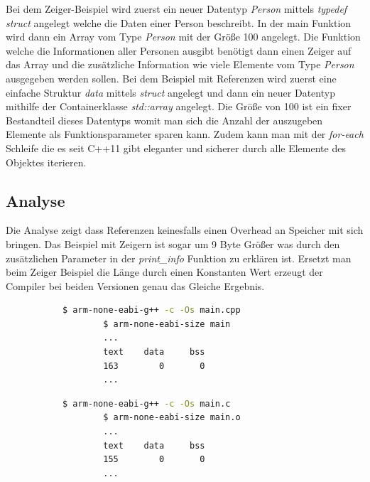 \documentclass[MES,Master,ngerman]{twbook}%
\begin{document}
Bei dem Zeiger-Beispiel wird zuerst ein neuer Datentyp \textit{Person} mittels \textit{typedef struct} angelegt welche die Daten einer Person beschreibt. In der main Funktion wird dann ein Array vom Type \textit{Person} mit der Größe 100 angelegt. Die Funktion welche die Informationen aller Personen ausgibt benötigt dann einen Zeiger auf das Array und die zusätzliche Information wie viele Elemente vom Type \textit{Person} ausgegeben werden sollen.\newline \newline
Bei dem Beispiel mit Referenzen wird zuerst eine einfache Struktur \textit{data} mittels \textit{struct} angelegt und dann ein neuer Datentyp mithilfe der Containerklasse \textit{std::array} angelegt. Die Größe von 100 ist ein fixer Bestandteil dieses Datentyps womit man sich die Anzahl der auszugeben Elemente als Funktionsparameter sparen kann. Zudem kann man mit der \textit{for-each} Schleife die es seit C++11 gibt eleganter und sicherer durch alle Elemente des Objektes iterieren. 

\subsection{Analyse}
Die Analyse zeigt dass Referenzen keinesfalls einen Overhead an Speicher mit sich bringen. Das Beispiel mit Zeigern ist sogar um 9 Byte Größer was durch den zusätzlichen Parameter in der \textit{print\_info} Funktion zu erklären ist. Ersetzt man beim Zeiger Beispiel die Länge durch einen Konstanten Wert erzeugt der Compiler bei beiden Versionen genau das Gleiche Ergebnis.


\begin{figure}[!htb]
	\begin{subfigure}[b]{0.5\textwidth}
		\begin{lstlisting}[gobble=6, title={Analyse Zeiger Beispiel}, language=bash, numbers=none]
		$ arm-none-eabi-g++ -c -Os main.cpp
		$ arm-none-eabi-size main
		...
		text    data     bss
		163        0       0
		...
		\end{lstlisting}
	\end{subfigure}
	\begin{subfigure}[b]{0.5\textwidth}
		\begin{lstlisting}[gobble=6, title={Analyse Referenze Beispiel}, language=bash, numbers=none]
		$ arm-none-eabi-g++ -c -Os main.c
		$ arm-none-eabi-size main.o
		...
		text    data     bss
		155        0       0
		...
		\end{lstlisting}
	\end{subfigure}
\end{figure}
\end{document}
